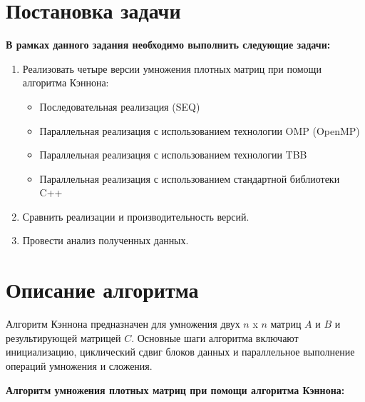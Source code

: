 \documentclass{report}
\begin{document}
\section*{Постановка задачи}
\par \textbf{В рамках данного задания необходимо выполнить следующие задачи:}
\begin{enumerate}
\item Реализовать четыре версии умножения плотных матриц при помощи алгоритма Кэннона:
\begin{itemize}
\item Последовательная реализация (SEQ)
\item Параллельная реализация с использованием технологии OMP (OpenMP)
\item Параллельная реализация с использованием технологии TBB
\item Параллельная реализация с использованием стандартной библиотеки C++
\end{itemize}
\item Сравнить реализации и производительность версий.
\item Провести анализ полученных данных.
\end{enumerate}
\newpage

\section*{Описание алгоритма}
\par Алгоритм Кэннона предназначен для умножения двух $n$ x $n$ матриц $A$ и $B$ и результирующей матрицей $C$.
Основные шаги алгоритма включают инициализацию, циклический сдвиг блоков данных и параллельное выполнение операций умножения и сложения.

\par \textbf{Алгоритм умножения плотных матриц при помощи алгоритма Кэннона:}
\end{document}
